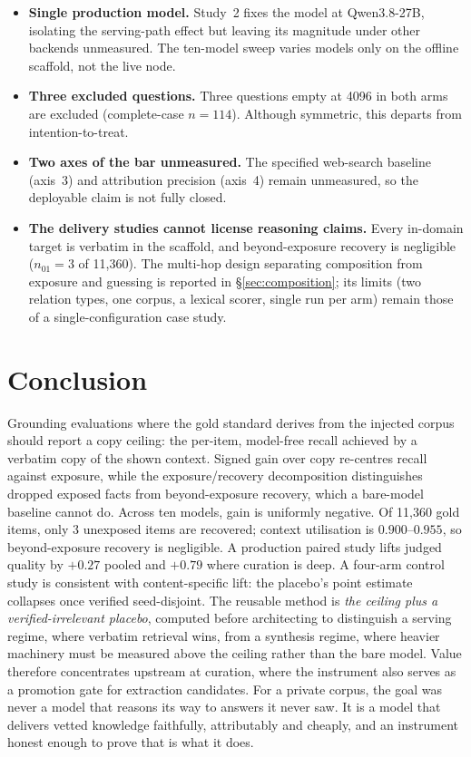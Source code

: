 \documentclass[10pt,twocolumn]{article}
\begin{document}
\begin{itemize}[topsep=2pt,itemsep=2pt,leftmargin=1.4em]
\item \textbf{Single production model.} Study~2 fixes the model at Qwen3.8-27B, isolating the serving-path effect but leaving its magnitude under other backends unmeasured. The ten-model sweep varies models only on the offline scaffold, not the live node.
\item \textbf{Three excluded questions.} Three questions empty at 4096 in both arms are excluded (complete-case $n=114$). Although symmetric, this departs from intention-to-treat.
\item \textbf{Two axes of the bar unmeasured.} The specified web-search baseline (axis~3) and attribution precision (axis~4) remain unmeasured, so the deployable claim is not fully closed.
\item \textbf{The delivery studies cannot license reasoning claims.} Every in-domain target is verbatim in the scaffold, and beyond-exposure recovery is negligible ($n_{01}=3$ of 11{,}360). The multi-hop design separating composition from exposure and guessing is reported in \S\ref{sec:composition}; its limits (two relation types, one corpus, a lexical scorer, single run per arm) remain those of a single-configuration case study.
\end{itemize}


\section{Conclusion}\label{sec:conclusion}
Grounding evaluations where the gold standard derives from the injected corpus should report a copy ceiling: the per-item, model-free recall achieved by a verbatim copy of the shown context. Signed gain over copy re-centres recall against exposure, while the exposure/recovery decomposition distinguishes dropped exposed facts from beyond-exposure recovery, which a bare-model baseline cannot do. Across ten models, gain is uniformly negative. Of 11{,}360 gold items, only 3 unexposed items are recovered; context utilisation is $0.900$--$0.955$, so beyond-exposure recovery is negligible. A production paired study lifts judged quality by $+0.27$ pooled and $+0.79$ where curation is deep. A four-arm control study is consistent with content-specific lift: the placebo's point estimate collapses once verified seed-disjoint. The reusable method is \emph{the ceiling plus a verified-irrelevant placebo}, computed before architecting to distinguish a serving regime, where verbatim retrieval wins, from a synthesis regime, where heavier machinery must be measured above the ceiling rather than the bare model. Value therefore concentrates upstream at curation, where the instrument also serves as a promotion gate for extraction candidates. For a private corpus, the goal was never a model that reasons its way to answers it never saw. It is a model that delivers vetted knowledge faithfully, attributably and cheaply, and an instrument honest enough to prove that is what it does.
\end{document}
